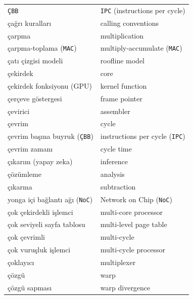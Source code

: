 {\begin{longtable}{@{}p{7.6cm}p{7.6cm}@{}}
\texttt{ÇBB} & \texttt{IPC} (instructions per cycle) \\
çağrı kuralları & calling conventions \\
çarpma & multiplication \\
çarpma-toplama (\texttt{MAC}) & multiply-accumulate (\texttt{MAC}) \\
çatı çizgisi modeli & roofline model \\
çekirdek & core \\
çekirdek fonksiyonu (GPU) & kernel function \\
çerçeve göstergesi & frame pointer \\
çevirici & assembler \\
çevrim & cycle \\
çevrim başına buyruk (\texttt{ÇBB}) & instructions per cycle (\texttt{IPC}) \\
çevrim zamanı & cycle time \\
çıkarım (yapay zeka) & inference \\
çözümleme & analysis \\
çıkarma & subtraction \\
yonga içi bağlantı ağı (\texttt{NoC}) & Network on Chip (\texttt{NoC}) \\
çok çekirdekli işlemci & multi-core processor \\
çok seviyeli sayfa tablosu & multi-level page table \\
çok çevrimli & multi-cycle \\
çok vuruşluk işlemci & multi-cycle processor \\
çoklayıcı & multiplexer \\
çözgü & warp \\
çözgü sapması & warp divergence \\


\end{longtable}}
